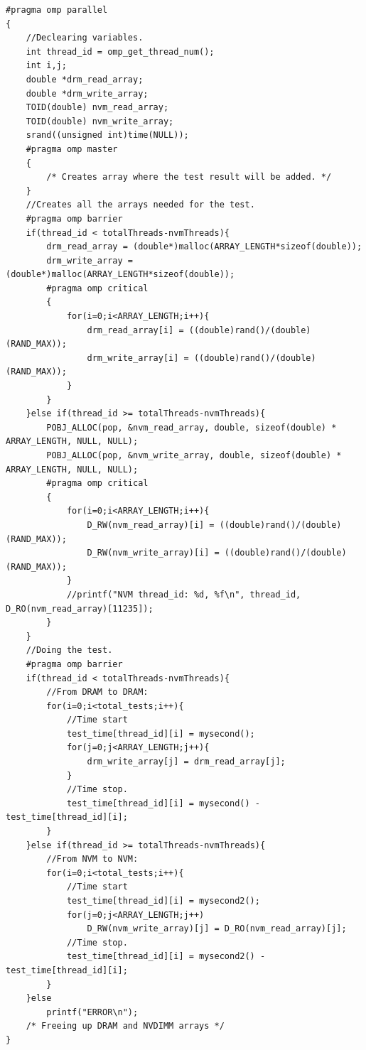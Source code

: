 \documentclass[12pt,a4paper,USenglish]{article}      %
\begin{document}
\begin{lstlisting}[caption={NVM-NVM source code},escapeinside={{/*!}{!*/}}, label={lst:NVMNVMcode}]
#pragma omp parallel
{
	//Declearing variables.
	int thread_id = omp_get_thread_num();
	int i,j;
	double *drm_read_array;
	double *drm_write_array;
	TOID(double) nvm_read_array;
	TOID(double) nvm_write_array;
	srand((unsigned int)time(NULL));	
	#pragma omp master
	{
		/* Creates array where the test result will be added. */
	}	
	//Creates all the arrays needed for the test.
	#pragma omp barrier
	if(thread_id < totalThreads-nvmThreads){
		drm_read_array = (double*)malloc(ARRAY_LENGTH*sizeof(double));
        drm_write_array = (double*)malloc(ARRAY_LENGTH*sizeof(double));
		#pragma omp critical
		{
			for(i=0;i<ARRAY_LENGTH;i++){
				drm_read_array[i] = ((double)rand()/(double)(RAND_MAX));
				drm_write_array[i] = ((double)rand()/(double)(RAND_MAX));
			}
		}
	}else if(thread_id >= totalThreads-nvmThreads){
		POBJ_ALLOC(pop, &nvm_read_array, double, sizeof(double) * ARRAY_LENGTH, NULL, NULL);
		POBJ_ALLOC(pop, &nvm_write_array, double, sizeof(double) * ARRAY_LENGTH, NULL, NULL);
		#pragma omp critical
		{
			for(i=0;i<ARRAY_LENGTH;i++){
				D_RW(nvm_read_array)[i] = ((double)rand()/(double)(RAND_MAX));
				D_RW(nvm_write_array)[i] = ((double)rand()/(double)(RAND_MAX));
			}
			//printf("NVM thread_id: %d, %f\n", thread_id, D_RO(nvm_read_array)[11235]);
		}
	}
	//Doing the test.
	#pragma omp barrier
	if(thread_id < totalThreads-nvmThreads){
		//From DRAM to DRAM:
		for(i=0;i<total_tests;i++){
			//Time start
			test_time[thread_id][i] = mysecond();
			for(j=0;j<ARRAY_LENGTH;j++){
				drm_write_array[j] = drm_read_array[j];
			}
			//Time stop.
			test_time[thread_id][i] = mysecond() - test_time[thread_id][i];
		}
	}else if(thread_id >= totalThreads-nvmThreads){
		//From NVM to NVM:
		for(i=0;i<total_tests;i++){
			//Time start
			test_time[thread_id][i] = mysecond2();
			for(j=0;j<ARRAY_LENGTH;j++)
				D_RW(nvm_write_array)[j] = D_RO(nvm_read_array)[j];
			//Time stop.
			test_time[thread_id][i] = mysecond2() - test_time[thread_id][i];
		}
	}else
		printf("ERROR\n");
	/* Freeing up DRAM and NVDIMM arrays */
}
\end{lstlisting}
\end{document}
